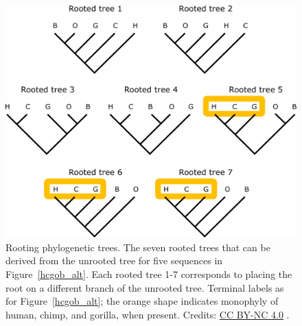 \begin{figure}[!htbp]
\centering
\includegraphics[width=1\linewidth]{files/hcgob-roots_alt-640b0ad0cfd8f7fb2883616031ec06b3.pdf}
\caption[]{Rooting phylogenetic trees.
The seven rooted trees that can be derived from the unrooted tree for five sequences in Figure~\ref{hcgob_alt}.
Each rooted tree 1-7 corresponds to placing the root on a different branch of the unrooted tree.
Terminal labels as for Figure~\ref{hcgob_alt}; the orange shape indicates monophyly of human, chimp, and gorilla, when present.
Credits: \href{https://creativecommons.org/licenses/by-nc/4.0/}{CC BY-NC 4.0} \cite{own_3_2024}.}
\label{hcgob_roots_alt}
\end{figure}

% 

